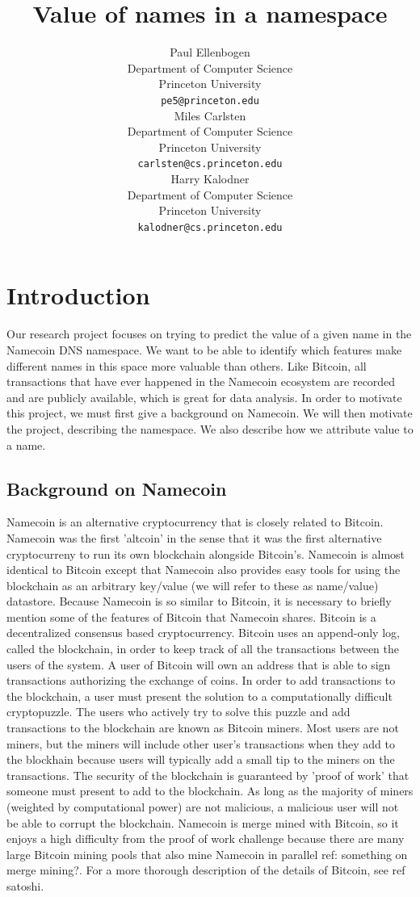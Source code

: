 \documentclass{article} %
\title{Value of names in a namespace}
\author{
Paul Ellenbogen \\
Department of Computer Science\\
Princeton University\\
\texttt{pe5@princeton.edu} \\
\And
Miles Carlsten\\
Department of Computer Science \\
Princeton University\\
\texttt{carlsten@cs.princeton.edu} \\
\And
Harry Kalodner\\
Department of Computer Science \\
Princeton University\\
\texttt{kalodner@cs.princeton.edu} \\
}
\begin{document}
\maketitle

\begin{abstract}
\end{abstract}

\section{Introduction}
    Our research project focuses on trying to predict the value of a given name in the Namecoin DNS namespace. We want to be able to identify which features make different names in this space more valuable than others. Like Bitcoin, all transactions that have ever happened in the Namecoin ecosystem are recorded and are publicly available, which is great for data analysis. In order to motivate this project, we must first give a background on Namecoin. We will then motivate the project, describing the namespace. We also describe how we attribute value to a name. 

\subsection{Background on Namecoin}
    Namecoin is an alternative cryptocurrency that is closely related to Bitcoin. Namecoin was the first 'altcoin' in the sense that it was the first alternative cryptocurreny to run its own blockchain alongside Bitcoin's. Namecoin is almost identical to Bitcoin except that Namecoin also provides easy tools for using the blockchain as an arbitrary key/value (we will refer to these as name/value) datastore. Because Namecoin is so similar to Bitcoin, it is necessary to briefly mention some of the features of Bitcoin that Namecoin shares. Bitcoin is a decentralized consensus based cryptocurrency. Bitcoin uses an append-only log, called the blockchain, in order to keep track of all the transactions between the users of the system. A user of Bitcoin will own an address that is able to sign transactions authorizing the exchange of coins. In order to add transactions to the blockchain, a user must present the solution to a computationally difficult cryptopuzzle. The users who actively try to solve this puzzle and add transactions to the blockchain are known as Bitcoin miners. Most users are not miners, but the miners will include other user's transactions when they add to the blockhain because users will typically add a small tip to the miners on the transactions. The security of the blockchain is guaranteed by 'proof of work' that someone must present to add to the blockchain. As long as the majority of miners (weighted by computational power) are not malicious, a malicious user will not be able to corrupt the blockchain. Namecoin is merge mined with Bitcoin, so it enjoys a high difficulty from the proof of work challenge because there are many large Bitcoin mining pools that also mine Namecoin in parallel {ref: something on merge mining?}. For a more thorough description of the details of Bitcoin, see {ref satoshi}.
    
\end{document}
